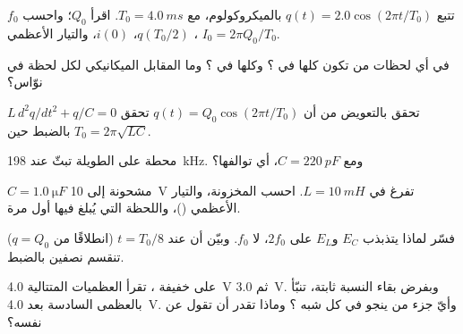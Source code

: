 \begin{exercise}[$\star$]\label{exo:g12:rlc-oscillations:4}
 تتبع $q(t) = 2.0\cos(2\pi t/T_0)$ بالميكروكولوم،
مع $T_0 = \qty{4.0}{ms}$. اقرأ $Q_0$؛ واحسب $f_0$، $q(T_0/2)$،
$i(0)$، والتيار الأعظمي $I_0 = 2\pi Q_0/T_0$.
\end{exercise}

\begin{exercise}[$\star$]\label{exo:g12:rlc-oscillations:5}
في أي لحظات من  تكون  كلها في
؟ وكلها في ؟ وما المقابل الميكانيكي
لكل لحظة في نوّاس؟
\end{exercise}

\begin{exercise}[$\star\star$]\label{exo:g12:rlc-oscillations:6}
تحقق بالتعويض من أن $q(t) = Q_0\cos(2\pi t/T_0)$ تحقق
$L\,d^2q/dt^2 + q/C = 0$ بالضبط حين $T_0 = 2\pi\sqrt{LC}$.
\end{exercise}

\begin{exercise}[$\star\star$]\label{exo:g12:rlc-oscillations:7}
محطة على  الطويلة تبثّ عند \qty{198}{kHz}. ومع
$C = \qty{220}{pF}$، أي  توالفها؟
\end{exercise}

\begin{exercise}[$\star\star$]\label{exo:g12:rlc-oscillations:8}
$C = \qty{1.0}{\micro F}$ مشحونة إلى \qty{10}{V} تفرغ في
$L = \qty{10}{mH}$. احسب  المخزونة، والتيار الأعظمي ()، واللحظة التي يُبلغ فيها أول مرة.
\end{exercise}

\begin{exercise}[$\star\star$]\label{exo:g12:rlc-oscillations:9}
فسّر لماذا يتذبذب $E_C$ و$E_L$ على  $2f_0$، لا $f_0$.
وبيّن أن  عند $t = T_0/8$ (انطلاقًا من $q = Q_0$) تنقسم
نصفين بالضبط.
\end{exercise}

\begin{exercise}[$\star\star$]\label{exo:g12:rlc-oscillations:10}
على   خفيفة ، تقرأ العظميات المتتالية
\qty{4.0}{V} ثم \qty{3.0}{V}. وبفرض بقاء النسبة
ثابتة، تنبّأ بالعظمى السادسة بعد \qty{4.0}{V}. وأيّ
جزء من \emph{} ينجو في كل شبه ؟ وماذا تقدر
أن تقول عن  نفسه؟
\end{exercise}

